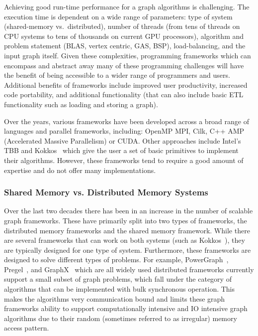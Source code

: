 Achieving good run-time performance for a graph algorithms is challenging. %
The execution time is dependent on a wide range of parameters: type of system (shared-memory vs.\ distributed), number of threads (from tens of threads on CPU systems to tens of thousands on current GPU processors), algorithm and problem statement (BLAS, vertex centric, GAS, BSP), load-balancing, and the input graph itself.
Given these complexities, programming frameworks which can encompass and abstract away many of these programming challenges will have the benefit of being accessible to a wider range of programmers and users. Additional benefits of frameworks include improved user productivity, increased code portability, and additional functionality (that can also include basic ETL functionality such as loading and storing a graph).

Over the years, various frameworks have been developed across a broad range of languages and parallel frameworks, including: OpenMP MPI, Cilk, C++ AMP (Accelerated Massive Parallelism) or CUDA.  Other approaches include Intel's TBB and  Kokkos~\cite{edwards2014kokkos} which give the user a set of basic primitives to implement their algorithms. However, these frameworks tend to require a good amount of expertise and do not offer many implementations.



\subsubsection{Shared Memory vs. Distributed Memory Systems}
Over the last two decades there has been in an increase in the number of scalable graph frameworks. These have primarily split into two types of frameworks, the distributed memory frameworks and the shared memory framework. While there are several frameworks that can work on both systems (such as Kokkos~\cite{edwards2014kokkos}), they are typically designed for one type of system.  Furthermore, these frameworks are designed to solve different types of problems. For example, PowerGraph~\cite{powergraph}, Pregel~\cite{pregel}, and GraphX~\cite{gonzalez2014graphx} which are all widely used distributed frameworks currently support a small subset of graph problems, which fall under the category of algorithms that can be implemented with bulk synchronous operation. This makes the algorithms very communication bound and limits these graph frameworks ability to support computationally intensive and IO intensive graph algorithms due to their random (sometimes referred to as irregular) memory access pattern.

